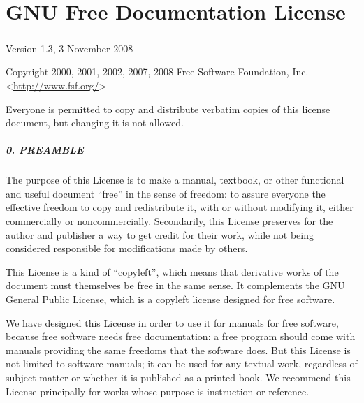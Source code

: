 \documentclass[10pt,]{book}
\theoremstyle{plain}
\theoremstyle{definition}
\theoremstyle{definition}
\theoremstyle{definition}
\theoremstyle{definition}
\numberwithin{equation}{section}
\begin{document}
\chapter[{GNU Free Documentation License}]{GNU Free Documentation License}\label{appendix-gfdl}
\typeout{************************************************}
\typeout{************************************************}
\paragraph[{}]{}\hypertarget{paragraphs-1}{}
Version 1.3, 3 November 2008%
\par
Copyright \textcopyright{} 2000, 2001, 2002, 2007, 2008 Free Software Foundation, Inc. \textless{}\url{http://www.fsf.org/}\textgreater{}%
\par
Everyone is permitted to copy and distribute verbatim copies of this license document, but changing it is not allowed.%
\typeout{************************************************}
\typeout{************************************************}
\paragraph[{0. PREAMBLE}]{0. PREAMBLE}\hypertarget{gfdl-section0}{}
The purpose of this License is to make a manual, textbook, or other functional and useful document ``free'' in the sense of freedom: to assure everyone the effective freedom to copy and redistribute it, with or without modifying it, either commercially or noncommercially. Secondarily, this License preserves for the author and publisher a way to get credit for their work, while not being considered responsible for modifications made by others.%
\par
This License is a kind of ``copyleft'', which means that derivative works of the document must themselves be free in the same sense. It complements the GNU General Public License, which is a copyleft license designed for free software.%
\par
We have designed this License in order to use it for manuals for free software, because free software needs free documentation: a free program should come with manuals providing the same freedoms that the software does. But this License is not limited to software manuals; it can be used for any textual work, regardless of subject matter or whether it is published as a printed book. We recommend this License principally for works whose purpose is instruction or reference.%
\typeout{************************************************}
\typeout{************************************************}
\end{document}

